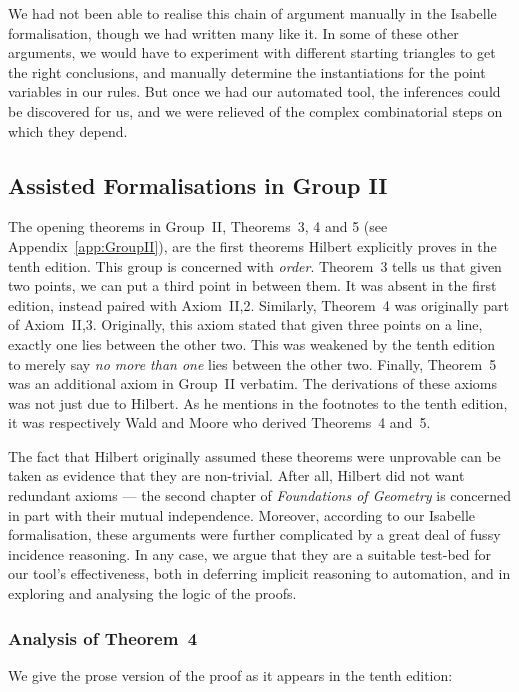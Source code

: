 We had not been able to realise this chain of argument manually in the Isabelle formalisation, though we had written many like it. In some of these other arguments, we would have to experiment with different starting triangles to get the right conclusions, and manually determine the instantiations for the point variables in our rules. But once we had our automated tool, the inferences could be discovered for us, and we were relieved of the complex combinatorial steps on which they depend.

\subsection{Assisted Formalisations in Group II}\label{sec:FormalisationAnalysis}
The opening theorems in Group~II, Theorems~3, 4 and 5 (see Appendix~\ref{app:GroupII}), are the first theorems Hilbert explicitly proves in the tenth edition. This group is concerned with \emph{order}. Theorem~3 tells us that given two points, we can put a third point in between them. It was absent in the first edition, instead paired with Axiom~II,2. Similarly, Theorem~4 was originally part of Axiom~II,3. Originally, this axiom stated that given three points on a line, exactly one lies between the other two. This was weakened by the tenth edition to merely say \emph{no more than one} lies between the other two. Finally, Theorem~5 was an additional axiom in Group~II verbatim. The derivations of these axioms was not just due to Hilbert. As he mentions in the footnotes to the tenth edition, it was respectively Wald and Moore who derived Theorems~4 and~5.

The fact that Hilbert originally assumed these theorems were unprovable can be taken as evidence that they are non-trivial. After all, Hilbert did not want redundant axioms --- the second chapter of \emph{Foundations of Geometry} is concerned in part with their mutual independence. Moreover, according to our Isabelle formalisation, these arguments were further complicated by a great deal of fussy incidence reasoning. In any case, we argue that they are a suitable test-bed for our tool's effectiveness, both in deferring implicit reasoning to automation, and in exploring and analysing the logic of the proofs.

\subsubsection{Analysis of Theorem~4}
We give the prose version of the proof as it appears in the tenth edition:

